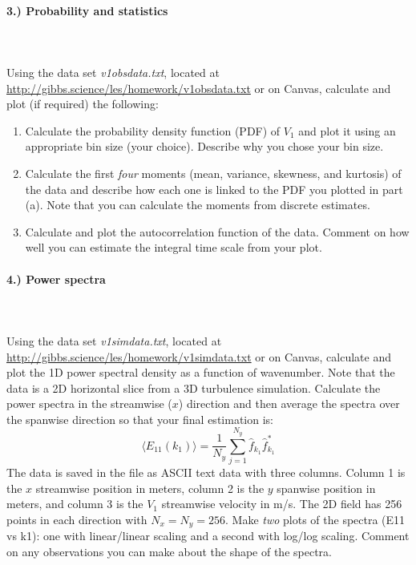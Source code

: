 \documentclass[11pt]{article}
\begin{document}
\paragraph{3.) Probability and statistics}~\\\\
Using the data set \textit{v1obsdata.txt}, located at \href{http://gibbs.science/les/homework/v1obsdata.txt}{http://gibbs.science/les/homework/v1obsdata.txt} or on Canvas, calculate and plot (if required) the following:
\begin{enumerate}[label=(\alph*),topsep=-10pt]
	\item Calculate the probability density function (PDF) of $V_1$ and plot it using an appropriate bin size (your choice). Describe why you chose your bin size.
	\item Calculate the first \textit{four} moments (mean, variance, skewness, and kurtosis) of the data and describe how each one is linked to the PDF you plotted in part (a). Note that you can calculate the moments from discrete estimates.
	\item Calculate and plot the autocorrelation function of the data. Comment on how well you can estimate the integral time scale from your plot.
\end{enumerate}


\paragraph{4.) Power spectra}~\\\\
Using the data set \textit{v1simdata.txt}, located at \href{http://gibbs.science/les/homework/v1simdata.txt}{http://gibbs.science/les/homework/v1simdata.txt} or on Canvas, calculate and plot the 1D power spectral density as a function of wavenumber. Note that the data is a 2D horizontal slice from a 3D turbulence simulation. Calculate the power spectra in the streamwise ($x$) direction and then average the spectra over the spanwise direction so that your final estimation is:
$$\langle E_{11}(k_1) \rangle = \frac{1}{N_y} \sum_{j=1}^{N_y} \hat f_{k_1} \hat f^*_{k_1}$$
The data is saved in the file as ASCII text data with three columns. Column 1 is the $x$ streamwise position in meters, column 2 is the $y$ spanwise position in meters, and column 3 is the $V_1$ streamwise velocity in m/s. The 2D field has 256 points in each direction with $N_x = N_y = 256$. Make \textit{two} plots of the spectra (E11 vs k1): one with linear/linear scaling and a second with log/log scaling. Comment on any observations you can make about the shape of the spectra.
\end{document}
